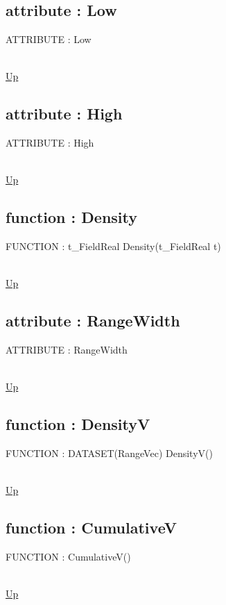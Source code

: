 \subsection*{attribute : Low}
\hypertarget{ecldoc:linearregression.ols.distributionbase.low}{ATTRIBUTE : Low} \\
\hyperlink{ecldoc:linearregression.ols.distributionbase}{Up} \\
\par
\subsection*{attribute : High}
\hypertarget{ecldoc:linearregression.ols.distributionbase.high}{ATTRIBUTE : High} \\
\hyperlink{ecldoc:linearregression.ols.distributionbase}{Up} \\
\par
\subsection*{function : Density}
\hypertarget{ecldoc:linearregression.ols.distributionbase.density}{FUNCTION : t\_FieldReal Density(t\_FieldReal t)} \\
\hyperlink{ecldoc:linearregression.ols.distributionbase}{Up} \\
\par
\subsection*{attribute : RangeWidth}
\hypertarget{ecldoc:linearregression.ols.distributionbase.rangewidth}{ATTRIBUTE : RangeWidth} \\
\hyperlink{ecldoc:linearregression.ols.distributionbase}{Up} \\
\par
\subsection*{function : DensityV}
\hypertarget{ecldoc:linearregression.ols.distributionbase.densityv}{FUNCTION : DATASET(RangeVec) DensityV()} \\
\hyperlink{ecldoc:linearregression.ols.distributionbase}{Up} \\
\par
\subsection*{function : CumulativeV}
\hypertarget{ecldoc:linearregression.ols.distributionbase.cumulativev}{FUNCTION : CumulativeV()} \\
\hyperlink{ecldoc:linearregression.ols.distributionbase}{Up} \\
\par
